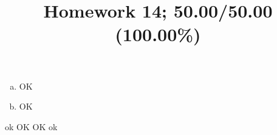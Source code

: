 \documentclass[10pt]{article} %
\title{Homework 14;
50.00/50.00 (100.00\%)
}
\begin{document}
\maketitle
{}
\begin{enumerate}[(a)]
  \item OK
  \item OK
\end{enumerate}
ok
OK
OK
ok
\end{document}
